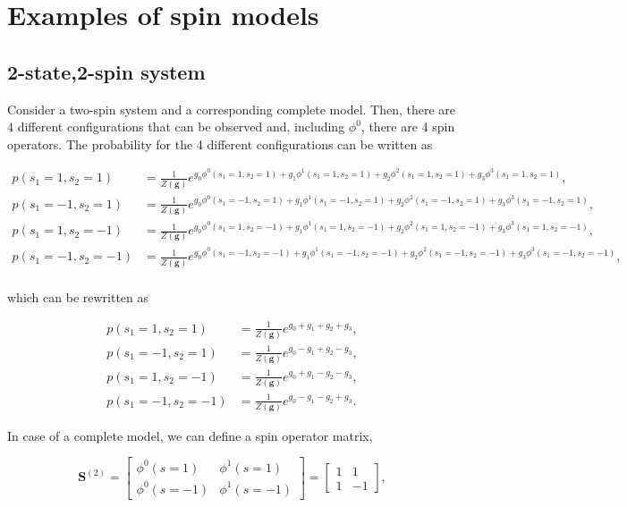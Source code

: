 \section{Examples of spin models}

\subsection{2-state,2-spin system}\label{sec:2spin_2states}

Consider a two-spin system and a corresponding complete model. Then, there are 4 different configurations that can be observed and, including $\phi^0$, there are 4 spin operators.
The probability for the 4 different configurations can be written as

\begin{align*}
    p(s_1=1, s_2=1) &= \frac{1}{Z(\mathbf{g})} e^{g_0 \phi^0(s_1=1, s_2=1) + g_1 \phi^1(s_1=1, s_2=1) + g_2 \phi^2(s_1=1, s_2=1) + g_3 \phi^3(s_1=1, s_2=1)},\\
    p(s_1=-1, s_2=1) &= \frac{1}{Z(\mathbf{g})} e^{g_0 \phi^0(s_1=-1, s_2=1) + g_1 \phi^1(s_1=-1, s_2=1) + g_2 \phi^2(s_1=-1, s_2=1) + g_3 \phi^3(s_1=-1, s_2=1)},\\
    p(s_1=1, s_2=-1) &= \frac{1}{Z(\mathbf{g})} e^{g_0 \phi^0(s_1=1, s_2=-1) + g_1 \phi^1(s_1=1, s_2=-1) + g_2 \phi^2(s_1=1, s_2=-1) + g_3 \phi^3(s_1=1, s_2=-1)},\\
    p(s_1=-1, s_2=-1) &= \frac{1}{Z(\mathbf{g})} e^{g_0 \phi^0(s_1=-1, s_2=-1) + g_1 \phi^1(s_1=-1, s_2=-1) + g_2 \phi^2(s_1=-1, s_2=-1) + g_3 \phi^3(s_1=-1, s_2=-1)},\\
\end{align*}

\noindent
which can be rewritten as

\begin{align*}
    p(s_1=1, s_2=1) &= \frac{1}{Z(\mathbf{g})} e^{g_0 + g_1 + g_2 + g_3},\\
    p(s_1=-1, s_2=1) &= \frac{1}{Z(\mathbf{g})} e^{g_0 - g_1 + g_2 - g_3},\\
    p(s_1=1, s_2=-1) &= \frac{1}{Z(\mathbf{g})} e^{g_0 + g_1 - g_2 - g_3},\\
    p(s_1=-1, s_2=-1) &= \frac{1}{Z(\mathbf{g})} e^{g_0 - g_1 - g_2 + g_3}.
\end{align*}

\noindent
In case of a complete model, we can define a spin operator matrix,

\begin{equation}
    \mathbf{S}^{(2)} = \begin{bmatrix}
        \phi^0(s=1) & \phi^1(s=1)\\
        \phi^0(s=-1) & \phi^1(s=-1)
    \end{bmatrix} = \begin{bmatrix}
        1 & 1\\
        1 & -1
    \end{bmatrix},
\end{equation}

